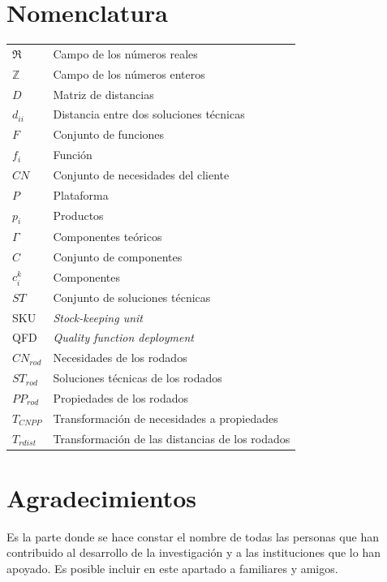 \documentclass[fleqn,10pt]{AmateCodex} %
\begin{document}
\section*{Nomenclatura}
\noindent 
\begin{center}
\begin{tabular}{lp{6cm}}
$\Re$ & Campo de los números reales\\
$\mathbb{Z}$ & Campo de los números enteros\\
$D$ & Matriz de distancias \\
$d_{ii}$ & Distancia entre dos soluciones técnicas\\
$F$ & Conjunto de funciones\\
$f_i$ & Función\\
$CN$ & Conjunto de necesidades del cliente\\
$P$ & Plataforma\\
$p_i$ & Productos\\
$\Gamma$ & Componentes teóricos\\
$C$ & Conjunto de componentes\\
$c_{i}^{k}$ & Componentes\\
$ST$ & Conjunto de soluciones técnicas\\
SKU & \textit{Stock-keeping unit}\\
QFD & \textit{Quality function deployment}\\
$CN_{rod}$ & Necesidades de los rodados\\
$ST_{rod}$ & Soluciones técnicas de los rodados\\
$PP_{rod}$ & Propiedades de los rodados\\
$T_{CNPP}$ & Transformación de necesidades a propiedades\\
$T_{rdist}$ & Transformación de las distancias de los rodados
\end{tabular}
\end{center}

\section*{Agradecimientos} %

Es la parte donde se hace constar el nombre de todas las personas que han contribuido al desarrollo de la investigación  y a las instituciones que lo han apoyado. Es posible incluir en este apartado a familiares y amigos.
\end{document}
